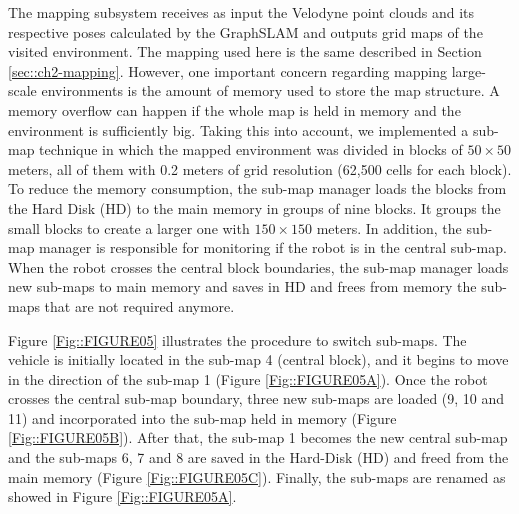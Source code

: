 The mapping subsystem receives as input the Velodyne point clouds and its respective poses calculated by the GraphSLAM and outputs grid maps of the visited environment. The mapping used here is the same described in Section \ref{sec::ch2-mapping}. However, one important concern regarding mapping large-scale environments is the amount of memory used to store the map structure. A memory overflow can happen if the whole map is held in memory and the environment is sufficiently big. Taking this into account, we implemented a sub-map technique in which the mapped environment was divided in blocks of $50\times50$ meters, all of them with 0.2 meters of grid resolution (62,500 cells for each block). To reduce the memory consumption, the sub-map manager loads the blocks from the Hard Disk (HD) to the main memory in groups of nine blocks. It groups the small blocks to create a larger one with $150\times150$ meters. In addition, the sub-map manager is responsible for monitoring if the robot is in the central sub-map. When the robot crosses the central block boundaries, the sub-map manager loads new sub-maps to main memory and saves in HD and frees from memory the sub-maps that are not required anymore.

Figure \ref{Fig::FIGURE05} illustrates the procedure to switch sub-maps. The vehicle is initially located in the sub-map 4 (central block), and it begins to move in the direction of the sub-map 1 (Figure \ref{Fig::FIGURE05A}). Once the robot crosses the central sub-map boundary, three new sub-maps are loaded (9, 10 and 11) and incorporated into the sub-map held in memory (Figure \ref{Fig::FIGURE05B}). After that, the sub-map 1 becomes the new central sub-map and the sub-maps 6, 7 and 8 are saved in the Hard-Disk (HD) and freed from the main memory (Figure \ref{Fig::FIGURE05C}). Finally, the sub-maps are renamed as showed in Figure \ref{Fig::FIGURE05A}.

